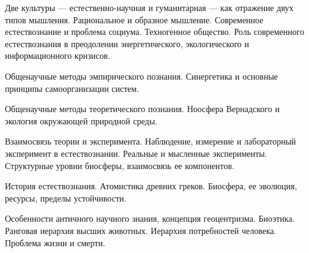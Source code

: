 \documentclass[
	14pt,
	a4paper,
	]
	{scrartcl}
\begin{document}
\shapk
{}
\setcounter{zad}{0}

\vfill
\z Две культуры --- естественно-научная и гуманитарная --- как отражение двух типов мышления. Рациональное и образное мышление.
 \vfill
\z Современное естествознание и проблема социума. Техногенное общество. Роль современного естествознания в преодолении энергетического, экологического и информационного кризисов. \vfill

\vfill

\newpage


\shapk
{}
\setcounter{zad}{0}

\vfill
\z Общенаучные методы эмпирического познания.
 \vfill
\z Синергетика и основные принципы самоорганизации систем.
 \vfill

\vfill

\newpage


\shapk
{}
\setcounter{zad}{0}

\vfill
\z Общенаучные методы теоретического познания.
 \vfill
\z Ноосфера Вернадского и экология окружающей природной среды.
 \vfill

\vfill

\newpage


\shapk
{}
\setcounter{zad}{0}

\vfill
\z Взаимосвязь теории и эксперимента. Наблюдение, измерение и лабораторный эксперимент в естествознании. Реальные и мысленные эксперименты.
 \vfill
\z Структурные уровни биосферы, взаимосвязь ее компонентов.
 \vfill

\vfill

\newpage


\shapk
{}
\setcounter{zad}{0}

\vfill
\z История естествознания. Атомистика древних греков.
 \vfill
\z Биосфера, ее эволюция, ресурсы, пределы устойчивости.
 \vfill

\vfill

\newpage


\shapk
{}
\setcounter{zad}{0}

\vfill
\z Особенности античного научного знания, концепция геоцентризма.
 \vfill
\z Биоэтика. Ранговая иерархия высших животных. Иерархия потребностей человека. Проблема жизни и смерти.
 \vfill

\vfill

\newpage


\shapk
{}
\setcounter{zad}{0}
\end{document}
